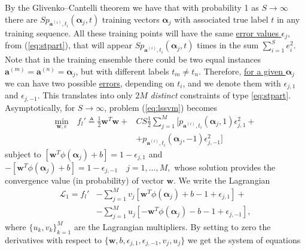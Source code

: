 \documentclass[final,twocolumn]{IEEEtran}
\begin{document}
	By the Glivenko–Cantelli theorem we have that with probability 1 as $S\rightarrow \infty$ there are $Sp_{\bm{a}^{(i)},t_i}(\bm{\alpha}_j,t)$ training vectors $\bm{\alpha}_j$ with associated true label $t$ in any training sequence.
	All these training points will have the same \uline{error values $\epsilon_j$}, from (\ref{eq:stpart}), that will appear $Sp_{\bm{a}^{(i)},t_i}(\bm{\alpha}_j,t)$ times in the sum $\sum_{i=1}^{S} e_i^2$.
	Note that in the training ensemble there could be two equal instances $\bm{a}^{(m)}=\bm{a}^{(n)}=\bm{\alpha}_j$, but with different labels $t_m \neq t_n$. Therefore, \uline{for a given $\bm{\alpha}_j$} we can have two possible \uline{errors}, depending on $t_i$, and we denote them with $\epsilon_{j,1}$ and $\epsilon_{j,-1}$.
	This translates into only $2M$ \textit{distinct} constraints of type \eqref{eq:stpart}.
	Asymptotically, for $S \to \infty$, problem (\ref{eq:lssvm}) becomes
		\begin{equation}
		\label{eq:lssvm2}
		\begin{split}
		\underset{\bm{w},e}{\text{min}} \quad f_l' \triangleq \frac{1}{2} \bm{w}^T \bm{w} + & C S \frac{1}{2} \sum_{j=1}^M [p_{\bm{a}^{(i)},t_i}(\bm{\alpha}_j,1) \epsilon_{j,1}^2 + \\
		&+p_{\bm{a}^{(i)},t_i}(\bm{\alpha}_j,-1) \epsilon_{j,-1}^2]  
		\end{split}
		\end{equation}
		subject to 
$
		[\bm{w}^T \phi (\bm{\alpha}_j) + b] = 1- \epsilon_{j,1}
$
and
$
-[\bm{w}^T \phi (\bm{\alpha}_j) + b] = 1- \epsilon_{j,-1}\quad j = 1 ,\dots,M,
$
	whose solution provides the convergence value (in probability) of vector $\bm{w}$. We write the Lagrangian
	\begin{equation}
	\begin{split}
	\mathcal{L}_1 = f_l'& - \sum_{j=1}^{M} v_j \left[ \bm{w}^T \phi (\bm{\alpha}_j) + b - 1 + \epsilon_{j,1} \right] + \\
	&- \sum_{j=1}^{M} u_j \left[- \bm{w}^T  \phi (\bm{\alpha}_j) - b  - 1 + \epsilon_{j,-1} \right], 
	\end{split}
	\end{equation}
	where $\{u_k,v_k\}_{k=1}^{M}$ are the Lagrangian multipliers. By setting to zero the derivatives with respect to $\{\bm{w},b,\epsilon_{j,1},\epsilon_{j,-1}, v_j,u_j\}$  we get the system of equations
\end{document}
